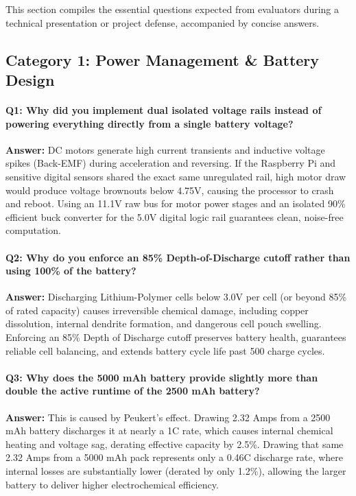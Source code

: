 \documentclass[11pt,a4paper]{article}
\begin{document}
This section compiles the essential questions expected from evaluators during a technical presentation or project defense, accompanied by concise answers.

\subsection{Category 1: Power Management \& Battery Design}

\paragraph{Q1: Why did you implement dual isolated voltage rails instead of powering everything directly from a single battery voltage?}
\textbf{Answer:} DC motors generate high current transients and inductive voltage spikes (Back-EMF) during acceleration and reversing. If the Raspberry Pi and sensitive digital sensors shared the exact same unregulated rail, high motor draw would produce voltage brownouts below 4.75V, causing the processor to crash and reboot. Using an 11.1V raw bus for motor power stages and an isolated 90\% efficient buck converter for the 5.0V digital logic rail guarantees clean, noise-free computation.

\paragraph{Q2: Why do you enforce an 85\% Depth-of-Discharge cutoff rather than using 100\% of the battery?}
\textbf{Answer:} Discharging Lithium-Polymer cells below 3.0V per cell (or beyond 85\% of rated capacity) causes irreversible chemical damage, including copper dissolution, internal dendrite formation, and dangerous cell pouch swelling. Enforcing an 85\% Depth of Discharge cutoff preserves battery health, guarantees reliable cell balancing, and extends battery cycle life past 500 charge cycles.

\paragraph{Q3: Why does the 5000 mAh battery provide slightly more than double the active runtime of the 2500 mAh battery?}
\textbf{Answer:} This is caused by Peukert's effect. Drawing 2.32 Amps from a 2500 mAh battery discharges it at nearly a 1C rate, which causes internal chemical heating and voltage sag, derating effective capacity by 2.5\%. Drawing that same 2.32 Amps from a 5000 mAh pack represents only a 0.46C discharge rate, where internal losses are substantially lower (derated by only 1.2\%), allowing the larger battery to deliver higher electrochemical efficiency.
\end{document}
